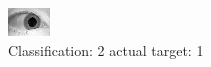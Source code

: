 \begin{figure}[h!]
\begin{center}
\includegraphics[width=0.60\columnwidth]{figures/ID1496_class_2_target_1.png}
\end{center}
\caption{ Classification: 2 actual target: 1}
\label{fig:ID1496_class_2_target_1}
\end{figure}
